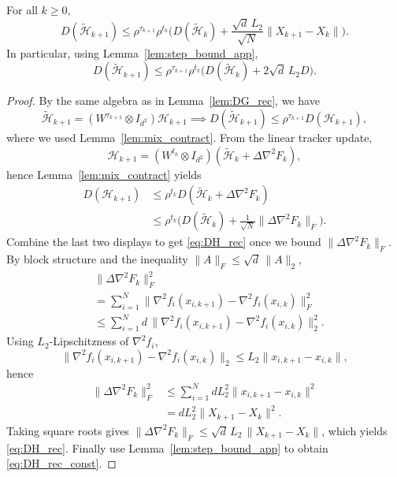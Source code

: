 \documentclass[review,onefignum,onetabnum]{siamart171218}
\begin{document}
\begin{lemma}\label{lem:DH_rec}
For all $k\ge0$,
\begin{equation}\label{eq:DH_rec}
D(\tilde{\mathcal H}_{k+1})
\le \rho^{\tau_{k+1}}\rho^{t_k}\Big(D(\tilde{\mathcal H}_k)+\frac{\sqrt d\,L_2}{\sqrt N}\|X_{k+1}-X_k\|\Big).
\end{equation}
In particular, using Lemma~\ref{lem:step_bound_app},
\begin{equation}\label{eq:DH_rec_const}
D(\tilde{\mathcal H}_{k+1})
\le \rho^{\tau_{k+1}}\rho^{t_k}\Big(D(\tilde{\mathcal H}_k)+2\sqrt d\,L_2D\Big).
\end{equation}
\end{lemma}
\begin{proof}
By the same algebra as in Lemma~\ref{lem:DG_rec}, we have
\[
\tilde{\mathcal H}_{k+1} = (W^{\tau_{k+1}}\!\otimes\! I_{d^2})\mathcal H_{k+1} \implies
D(\tilde{\mathcal H}_{k+1}) \le \rho^{\tau_{k+1}} D(\mathcal H_{k+1}),
\]
where we used Lemma~\ref{lem:mix_contract}. From the linear tracker update,
\[
\mathcal H_{k+1} = (W^{t_k}\!\otimes\! I_{d^2})(\tilde{\mathcal H}_k\!+\!\Delta\nabla^2 F_k),
\]
hence Lemma~\ref{lem:mix_contract} yields
\begin{align*}
D(\mathcal H_{k+1})
&\le \rho^{t_k}D(\tilde{\mathcal H}_k\!+\!\Delta\nabla^2 F_k)\\
&\le \rho^{t_k}\!\Big(D(\tilde{\mathcal H}_k)\!+\!\tfrac1{\sqrt N}\|\Delta\nabla^2 F_k\|_F\Big).
\end{align*}
Combine the last two displays to get \eqref{eq:DH_rec} once we bound $\|\Delta\nabla^2F_k\|_F$.
By block structure and the inequality $\|A\|_F\le \sqrt d\,\|A\|_2$,
\begin{align*}
&\|\Delta\nabla^2 F_k\|_F^2\\
&=\textstyle\sum_{i=1}^N\|\nabla^2 f_i(x_{i,k+1})\!-\!\nabla^2 f_i(x_{i,k})\|_F^2\\
&\le \textstyle\sum_{i=1}^N d\,\|\nabla^2 f_i(x_{i,k+1})\!-\!\nabla^2 f_i(x_{i,k})\|_2^2.
\end{align*}
Using $L_2$-Lipschitzness of $\nabla^2 f_i$,
\[
\|\nabla^2 f_i(x_{i,k+1})\!-\!\nabla^2 f_i(x_{i,k})\|_2\le L_2\|x_{i,k+1}\!-\!x_{i,k}\|,
\]
hence
\begin{align*}
\|\Delta\nabla^2 F_k\|_F^2
&\le \textstyle\sum_{i=1}^N d L_2^2\|x_{i,k+1}\!-\!x_{i,k}\|^2\\
&= dL_2^2\|X_{k+1}\!-\!X_k\|^2.
\end{align*}
Taking square roots gives $\|\Delta\nabla^2 F_k\|_F\le \sqrt d\,L_2\,\|X_{k+1}-X_k\|$,
which yields \eqref{eq:DH_rec}. Finally use Lemma~\ref{lem:step_bound_app} to obtain \eqref{eq:DH_rec_const}.
\end{proof}
\end{document}
